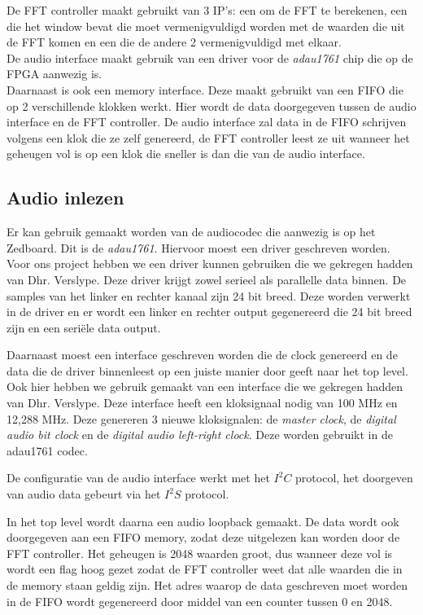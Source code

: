 \documentclass[a4paper,kul]{kulakarticle} %
\begin{document}
De FFT controller maakt gebruikt van 3 IP's: een om de FFT te berekenen, een die het window bevat die moet vermenigvuldigd worden met de waarden die uit de FFT komen en een die de andere 2 vermenigvuldigd met elkaar. \\

De audio interface maakt gebruik van een driver voor de \textit{adau1761} chip die op de FPGA aanwezig is.\\

Daarnaast is ook een memory interface. Deze maakt gebruikt van een FIFO die op 2 verschillende klokken werkt. Hier wordt de data doorgegeven tussen de audio interface en de FFT controller. De audio interface zal data in de FIFO schrijven volgens een klok die ze zelf genereerd, de FFT controller leest ze uit wanneer het geheugen vol is op een klok die sneller is dan die van de audio interface.

\subsection{Audio inlezen}

Er kan gebruik gemaakt worden van de audiocodec die aanwezig is op het Zedboard. Dit is de \textit{adau1761}. Hiervoor moest een driver geschreven worden. Voor ons project hebben we een driver kunnen gebruiken die we gekregen hadden van Dhr. Verslype. Deze driver krijgt zowel serieel als parallelle data binnen. De samples van het linker en rechter kanaal zijn 24 bit breed. Deze worden verwerkt in de driver en er wordt een linker en rechter output gegenereerd die 24 bit breed zijn en een seriële data output. \newline

Daarnaast moest een interface geschreven worden die de clock genereerd en de data die de driver binnenleest op een juiste manier door geeft naar het top level. Ook hier hebben we gebruik gemaakt van een interface die we gekregen hadden van Dhr. Verslype. Deze interface heeft een kloksignaal nodig van 100 MHz en 12,288 MHz. Deze genereren 3 nieuwe kloksignalen: de \textit{master clock}, de \textit{digital audio bit clock} en de \textit{digital audio left-right clock}. Deze worden gebruikt in de adau1761 codec. \newline

De configuratie van de audio interface werkt met het $I^2C$ protocol, het doorgeven van audio data gebeurt via het $I^2S$ protocol.\newline

In het top level wordt daarna een audio loopback gemaakt. De data wordt ook doorgegeven aan een FIFO memory, zodat deze uitgelezen kan worden door de FFT controller. Het geheugen is 2048 waarden groot, dus wanneer deze vol is wordt een flag hoog gezet zodat de FFT controller weet dat alle waarden die in de memory staan geldig zijn. Het adres waarop de data geschreven moet worden in de FIFO wordt gegenereerd door middel van een counter tussen 0 en 2048. 
\end{document}
